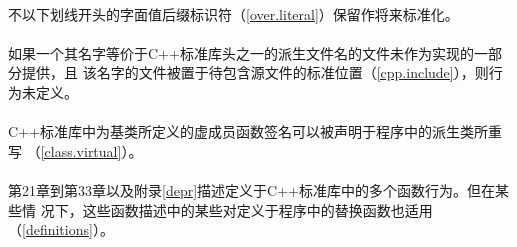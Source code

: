 \paragraph{}
不以下划线开头的字面值后缀标识符（\ref{over.literal}）保留作将来标准化。

\paragraph{}
如果一个其名字等价于C++标准库头之一的派生文件名的文件未作为实现的一部分提供，且
该名字的文件被置于待包含源文件的标准位置（\ref{cpp.include}），则行为未定义。

\paragraph{}
C++标准库中为基类所定义的虚成员函数签名可以被声明于程序中的派生类所重写
（\ref{class.virtual}）。

\paragraph{}
第21章到第33章以及附录\ref{depr}描述定义于C++标准库中的多个函数行为。但在某些情
况下，这些函数描述中的某些对定义于程序中的替换函数也适用（\ref{definitions}）。

